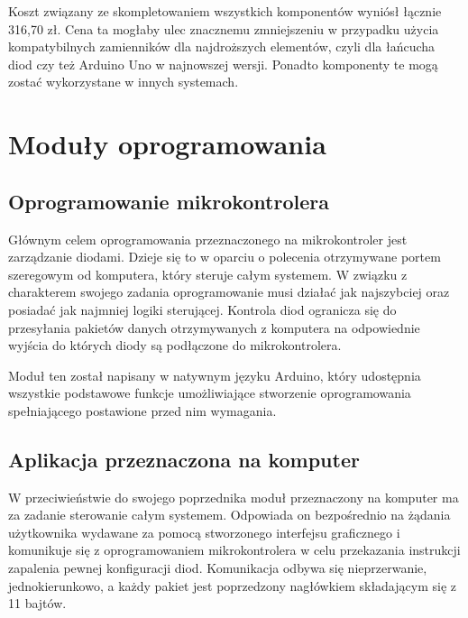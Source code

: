\documentclass[12pt]{report}
\begin{document}
Koszt związany ze skompletowaniem wszystkich komponentów wyniósł łącznie 316,70 zł. Cena ta mogłaby ulec znacznemu zmniejszeniu w przypadku użycia kompatybilnych zamienników dla najdroższych elementów, czyli dla łańcucha diod czy też Arduino Uno w najnowszej wersji. Ponadto komponenty te mogą zostać wykorzystane w innych systemach.













\section{Moduły oprogramowania}

\subsection{Oprogramowanie mikrokontrolera}

Głównym celem oprogramowania przeznaczonego na mikrokontroler jest zarządza\-nie diodami. Dzieje się to w oparciu o polecenia otrzymywane portem szeregowym od komputera, który steruje całym systemem. W związku z charakterem swojego zadania oprogramowanie musi działać jak najszybciej oraz posiadać jak najmniej logiki sterującej. Kontrola diod ogranicza się do przesyłania pakietów danych otrzymywanych z komputera na odpowiednie wyjścia do których diody są podłączone do mikrokontrolera. 

Moduł ten został napisany w natywnym języku Arduino, który udostępnia wszystkie podstawowe funkcje umożliwiające stworzenie oprogramowania spełniającego postawione przed nim wymagania.

\subsection{Aplikacja przeznaczona na komputer}

W przeciwieństwie do swojego poprzednika moduł przeznaczony na komputer ma za zadanie sterowanie całym systemem. Odpowiada on bezpośrednio na żądania użytkownika wydawane za pomocą stworzonego interfejsu graficznego i komunikuje się z oprogramowaniem mikrokontrolera w celu przekazania instrukcji zapalenia pewnej konfiguracji diod. Komunikacja odbywa się nieprzerwanie, jednokierunkowo, a każdy pakiet jest poprzedzony nagłówkiem składającym się z 11 bajtów.
\end{document}
